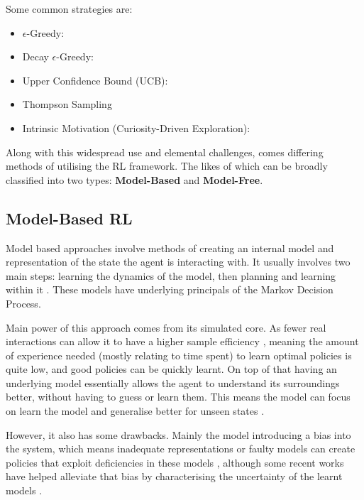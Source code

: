   Some common strategies are:
  \begin{itemize}
    \item $\epsilon$-Greedy:
    \item Decay $\epsilon$-Greedy:
    \item Upper Confidence Bound (UCB):
    \item Thompson Sampling
    \item Intrinsic Motivation (Curiosity-Driven Exploration):
  \end{itemize}
  
  Along with this widespread use and elemental challenges, comes differing methods of utilising the RL framework. The likes of which can be broadly classified into two types: \textbf{Model-Based} and \textbf{Model-Free}.
  
  \subsection{Model-Based RL}
  Model based approaches involve methods of creating an internal model and representation of the state the agent is interacting with. It usually involves two main steps: learning the dynamics of the model, then planning and learning within it \cite{MAL-086}. These models have underlying principals of the Markov Decision Process.

  Main power of this approach comes from its simulated core. As fewer real interactions can allow it to have a higher sample efficiency \cite{liu2021DRLminireview,wu23robotLearn}, meaning the amount of experience needed (mostly relating to time spent) to learn optimal policies is quite low, and good policies can be quickly learnt.
  On top of that having an underlying model essentially allows the agent to understand its surroundings better, without having to guess or learn them. This means the model can focus on learn the model and generalise better for unseen states \cite{MAL-086}.
  
  However, it also has some drawbacks. Mainly the model introducing a bias into the system, which means inadequate representations or faulty models can create policies that exploit deficiencies in these models \cite{Deisenroth2011PILCO,wang2019benchmarkingmodelbasedreinforcementlearning}, although some recent works have helped alleviate that bias by characterising the uncertainty of the learnt models \cite{kurutach2018modelensembletrustregionpolicyoptimization,chua2018deepreinforcementlearninghandful,clavera2018modelbasedreinforcementlearningmetapolicy}.

